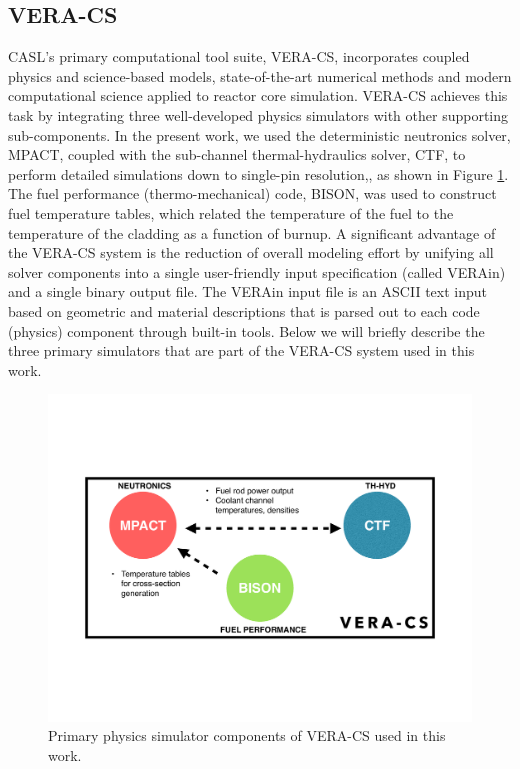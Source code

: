 \documentclass[edeposit,fullpage,12pt]{uiucthesis2009}
\begin{document}
\subsection{VERA-CS}
\gls{CASL}'s primary computational tool suite, VERA-CS, incorporates coupled physics and science-based models, state-of-the-art numerical methods and modern computational science applied to reactor core simulation. 
VERA-CS achieves this task by integrating three well-developed physics simulators with other supporting sub-components. 
In the present work, we used the deterministic neutronics solver, MPACT, coupled with the sub-channel thermal-hydraulics solver, CTF, to perform detailed simulations down to single-pin resolution,, as shown in Figure \ref{fig:workflow}.
The fuel performance (thermo-mechanical) code, BISON, was used to construct fuel temperature tables, which related the temperature of the fuel to the temperature of the cladding as a function of burnup.  
A significant advantage of the VERA-CS system is the reduction of overall modeling effort by unifying all solver components into a single user-friendly input specification (called VERAin) and a single binary output file.
The VERAin input file is an ASCII text input based on geometric and material descriptions that is parsed out to each code (physics) component through built-in tools. 
Below we will briefly describe the three primary simulators that are part of the VERA-CS system used in this work.

\begin{figure}
\begin{center}
\includegraphics[width=0.5\linewidth,trim={2cm 5cm 2cm 5cm}]{./Figures/VERA-CS-Figure.pdf}
\end{center}
\caption{Primary physics simulator components of VERA-CS used in this work.}
\label{fig:workflow}
\end{figure} 
\end{document}
